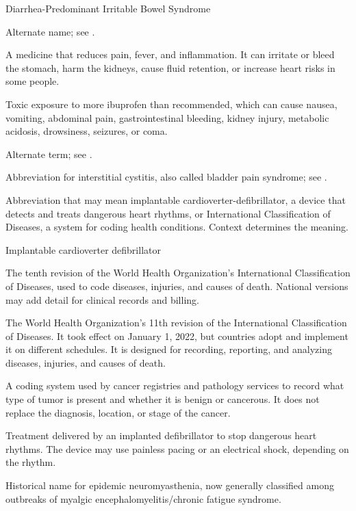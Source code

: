 \synonyms
Diarrhea-Predominant Irritable Bowel Syndrome

 Alternate name; see .

 A medicine that reduces pain, fever, and inflammation. It can irritate or bleed the stomach, harm the kidneys, cause fluid retention, or increase heart risks in some people.

 Toxic exposure to more ibuprofen than recommended, which can cause nausea, vomiting, abdominal pain, gastrointestinal bleeding, kidney injury, metabolic acidosis, drowsiness, seizures, or coma.

 Alternate term; see .

 Abbreviation for interstitial cystitis, also called bladder pain syndrome; see .

 Abbreviation that may mean implantable cardioverter-defibrillator, a device that detects and treats dangerous heart rhythms, or International Classification of Diseases, a system for coding health conditions. Context determines the meaning.

\synonyms
Implantable cardioverter defibrillator

 The tenth revision of the World Health Organization’s International Classification of Diseases, used to code diseases, injuries, and causes of death. National versions may add detail for clinical records and billing.

 The World Health Organization's 11th revision of the International Classification of Diseases. It took effect on January 1, 2022, but countries adopt and implement it on different schedules. It is designed for recording, reporting, and analyzing diseases, injuries, and causes of death.

 A coding system used by cancer registries and pathology services to record what type of tumor is present and whether it is benign or cancerous. It does not replace the diagnosis, location, or stage of the cancer.

 Treatment delivered by an implanted defibrillator to stop dangerous heart rhythms. The device may use painless pacing or an electrical shock, depending on the rhythm.

 Historical name for epidemic neuromyasthenia, now generally classified among outbreaks of myalgic encephalomyelitis/chronic fatigue syndrome.

